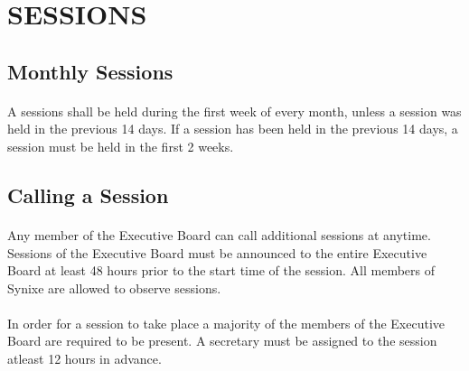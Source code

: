 \documentclass[10pt,a4paper]{article}
\begin{document}
\section{SESSIONS}
\subsection{Monthly Sessions}
\paragraph{}
A sessions shall be held during the first week of every month, unless a session was held in the previous 14 days. If a session has been held in the previous 14 days, a session must be held in the first 2 weeks.
\subsection{Calling a Session}
\paragraph{}
Any member of the Executive Board can call additional sessions at anytime. Sessions of the Executive Board must be announced to the entire Executive Board at least 48 hours prior to the start time of the session. All members of Synixe are allowed to observe sessions.
\paragraph{}
In order for a session to take place a majority of the members of the Executive Board are required to be present. A secretary must be assigned to the session atleast 12 hours in advance.
\end{document}
